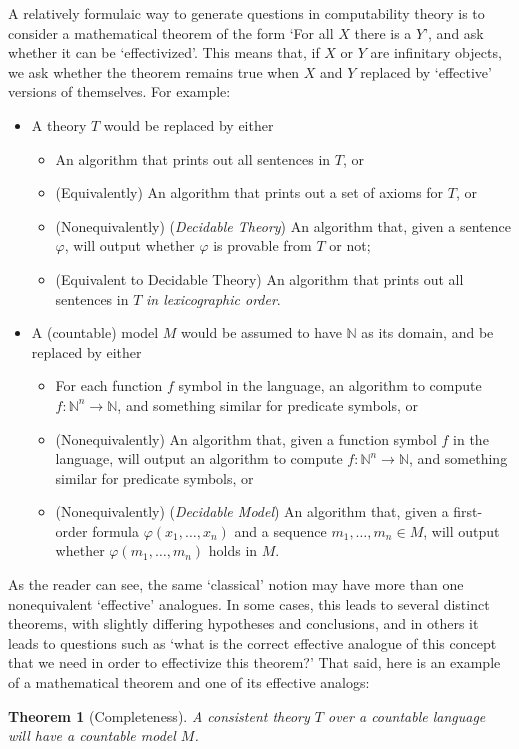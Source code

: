 \documentclass{article}
\newtheorem{theorem}{Theorem}[section]
\theoremstyle{nonumberplain}
\newcommand{\N}{\mathbb{N}}
\begin{document}
A relatively formulaic way to generate questions in computability theory is to consider a mathematical theorem of the form `For all $X$ there is a $Y$', and ask whether it can be `effectivized'. This means that, if $X$ or $Y$ are infinitary objects, we ask whether the theorem remains true when $X$ and $Y$ replaced by `effective' versions of themselves. For example:
\begin{itemize}
\item A theory $T$ would be replaced by either
\begin{itemize}
\item An algorithm that prints out all sentences in $T$, or
\item (Equivalently) An algorithm that prints out a set of axioms for $T$, or
\item (Nonequivalently) (\emph{Decidable Theory}) An algorithm that, given a sentence $\varphi$, will output whether $\varphi$ is provable from $T$ or not;
\item (Equivalent to Decidable Theory) An algorithm that prints out all sentences in $T$ \emph{in lexicographic order}.
\end{itemize}
\item A (countable) model $M$ would be assumed to have $\N$ as its domain, and be replaced by either
\begin{itemize}
\item For each function $f$ symbol in the language, an algorithm to compute $f \colon \N^n \to \N$, and something similar for predicate symbols, or
\item (Nonequivalently) An algorithm that, given a function symbol $f$ in the language, will output an algorithm to compute $f \colon \N^n \to \N$, and something similar for predicate symbols, or
\item (Nonequivalently) (\emph{Decidable Model}) An algorithm that, given a first-order formula $\varphi(x_1, \dots, x_n)$ and a sequence $m_1, \dots, m_n \in M$, will output whether $\varphi(m_1, \dots, m_n)$ holds in $M$.
\end{itemize}
\end{itemize}

As the reader can see, the same `classical' notion may have more than one nonequivalent `effective' analogues. In some cases, this leads to several distinct theorems, with slightly differing hypotheses and conclusions, and in others it leads to questions such as `what is the correct effective analogue of this concept that we need in order to effectivize this theorem?' That said, here is an example of a mathematical theorem and one of its effective analogs:
\begin{theorem}[Completeness]
A consistent theory $T$ over a countable language will have a countable model $M$.
\end{theorem}
\end{document}
